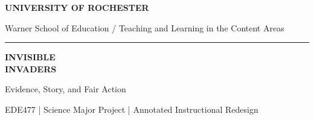 \documentclass[10pt,letterpaper]{article}
\begin{document}
\hypersetup{pageanchor=false}
\begin{titlepage}
\thispagestyle{empty}

\begin{center}
{\large\bfseries\color{DeepNavy}UNIVERSITY OF ROCHESTER}\par
{\small Warner School of Education \; / \; Teaching and Learning in the Content Areas}\par\vspace{0.16in}
{\color{PrimaryRed}\rule{\linewidth}{1.5pt}}\par\vspace{0.22in}
{\Huge\bfseries\color{DeepNavy}INVISIBLE\\[0.045in] INVADERS}\par\vspace{0.11in}
{\LARGE\color{PrimaryRed}Evidence, Story, and Fair Action}\par\vspace{0.09in}
{\normalsize EDE477 \; | \; Science Major Project \; | \; Annotated Instructional Redesign}
\end{center}


\end{titlepage}
\end{document}
